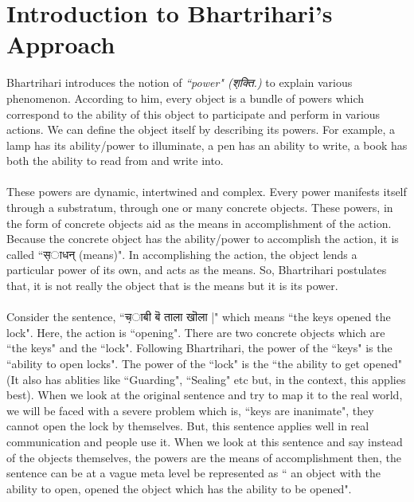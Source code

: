 \documentclass[a4paper,10pt]{article}
\begin{document}
\newpage
\section{Introduction to Bhartrihari's Approach}

Bhartrihari introduces the notion of \textit{``power" ({\d शक्ति.})} to explain various phenomenon. 
According to him, every object is a bundle of powers which correspond to the ability of this object to participate and perform in various actions. 
We can define the object itself by describing its powers. For example, a lamp has its ability/power to illuminate, a pen has an ability to write,
a book has both the ability to read from and write into.

\paragraph{} These powers are dynamic, intertwined and complex. Every power manifests itself through a substratum, through one or many concrete objects. 
These powers, in the form of concrete objects aid as the means in accomplishment of the action. Because the concrete object has the ability/power 
to accomplish the action, it is called ``{\d साधन्} (means)".
In accomplishing the action, the object lends a particular power of its own, and acts as the means. So, Bhartrihari postulates that, it is not really the object that is the means but it is its power.

\paragraph{} Consider the sentence, ``{\d चाबी बॆ ताला खॊला }|" which means ``the keys opened the lock". Here, the action is ``opening". 
There are two concrete objects which are ``the keys" and the ``lock". Following Bhartrihari, the power of the ``keys" is the ``ability to open locks". 
The power of the ``lock" is the ``the ability to get opened" (It also has ablities like ``Guarding", ``Sealing" etc but, in the context, this applies best). 
When we look at the original sentence and try to map it to the real world, we will be faced with a severe problem which is, ``keys are inanimate", 
they cannot open the lock by themselves. But, this sentence applies well in real communication and people use it. When we look at this sentence and say 
instead of the objects themselves, the powers are the means of accomplishment then, the sentence can be at a vague meta level be represented as 
`` an object with the ability to open, opened the object which has the ability to be opened". 
\end{document}
